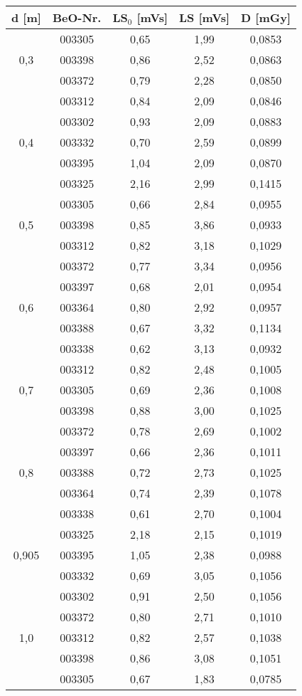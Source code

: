 \minipanf
	\begin{center}	
		\begin{tabular}{c|c|c|c|c}
				\textbf{d} [m] & BeO-Nr. & \textbf{LS$_0$} [mVs] & \textbf{LS} [mVs] & \textbf{D} [mGy] \\
			\hline  
								& 003305 & 0,65 & 1,99 & 0,0853\\
						0,3		& 003398 & 0,86 & 2,52 & 0,0863\\
								& 003372 & 0,79 & 2,28 & 0,0850\\
								& 003312 & 0,84 & 2,09 & 0,0846\\
			\hline  
								& 003302 & 0,93 & 2,09 & 0,0883\\
						0,4		& 003332 & 0,70 & 2,59 & 0,0899\\
								& 003395 & 1,04 & 2,09 & 0,0870\\
								& 003325 & 2,16 & 2,99 & 0,1415\\
			\hline  
                                & 003305 & 0,66 & 2,84 & 0,0955\\
                        0,5     & 003398 & 0,85 & 3,86 & 0,0933\\
                                & 003312 & 0,82 & 3,18 & 0,1029\\
                                & 003372 & 0,77 & 3,34 & 0,0956\\
            \hline
                                & 003397 & 0,68 & 2,01 & 0,0954\\
                        0,6     & 003364 & 0,80 & 2,92 & 0,0957\\
                                & 003388 & 0,67 & 3,32 & 0,1134\\
                                & 003338 & 0,62 & 3,13 & 0,0932\\
            \hline
								& 003312 & 0,82 & 2,48 & 0,1005\\
						0,7		& 003305 & 0,69 & 2,36 & 0,1008\\
								& 003398 & 0,88 & 3,00 & 0,1025\\
								& 003372 & 0,78 & 2,69 & 0,1002\\
			\hline  
								& 003397 & 0,66 & 2,36 & 0,1011\\
						0,8		& 003388 & 0,72 & 2,73 & 0,1025\\
								& 003364 & 0,74 & 2,39 & 0,1078\\
								& 003338 & 0,61 & 2,70 & 0,1004\\
			\hline  
								& 003325 & 2,18 & 2,15 & 0,1019\\
						0,905   & 003395 & 1,05 & 2,38 & 0,0988\\
								& 003332 & 0,69 & 3,05 & 0,1056\\
								& 003302 & 0,91 & 2,50 & 0,1056\\
			\hline  
								& 003372 & 0,80 & 2,71 & 0,1010\\
						1,0		& 003312 & 0,82 & 2,57 & 0,1038\\
								& 003398 & 0,86 & 3,08 & 0,1051\\
								& 003305 & 0,67 & 1,83 & 0,0785\\
								

\end{tabular}
\end{center}
